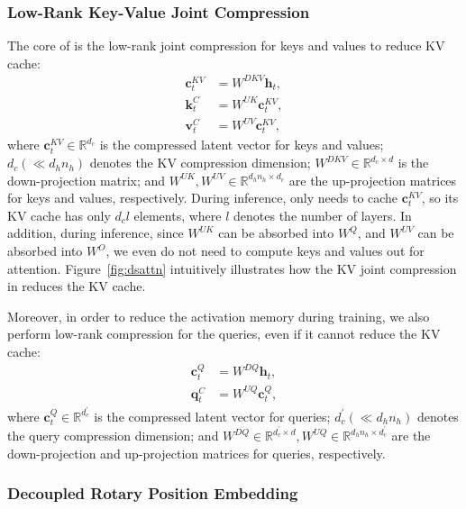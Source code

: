 \subsubsection{Low-Rank Key-Value Joint Compression}

The core of \dsattn{} is the low-rank joint compression for keys and values to reduce KV cache:
\begin{align}
    \mathbf{c}_{t}^{KV} &= W^{DKV} \mathbf{h}_{t}, \\
    \label{eq:c_to_k}
    \mathbf{k}_{t}^{C} &= W^{UK} \mathbf{c}_{t}^{KV}, \\
    \mathbf{v}_{t}^{C} &= W^{UV} \mathbf{c}_{t}^{KV},
\end{align}
where $\mathbf{c}_{t}^{KV} \in \mathbb{R}^{d_c}$ is the compressed latent vector for keys and values; 
$d_c (\ll d_h n_h)$ denotes the KV compression dimension;
$W^{DKV} \in \mathbb{R}^{d_c \times d}$ is the down-projection matrix;
and $W^{UK},W^{UV} \in \mathbb{R}^{d_h n_h \times d_c}$ are the up-projection matrices for keys and values, respectively. 
During inference, \dsattn{} only needs to cache $\mathbf{c}_{t}^{KV}$, so its KV cache has only $d_{c}l$ elements, where $l$ denotes the number of layers. 
In addition, during inference, since $W^{UK}$ can be absorbed into $W^{Q}$, and $W^{UV}$ can be absorbed into $W^{O}$, we even do not need to compute keys and values out for attention. 
Figure~\ref{fig:dsattn} intuitively illustrates how the KV joint compression in \dsattn{} reduces the KV cache. 

Moreover, in order to reduce the activation memory during training, we also perform low-rank compression for the queries, even if it cannot reduce the KV cache:
\begin{align}
    \mathbf{c}_{t}^{Q} &= W^{DQ} \mathbf{h}_{t}, \\
    \mathbf{q}_{t}^{C} &= W^{UQ} \mathbf{c}_{t}^{Q},
\end{align}
where $\mathbf{c}_{t}^{Q} \in \mathbb{R}^{d_c^{\prime}}$ is the compressed latent vector for queries; 
$d_c^{\prime} (\ll d_h n_h)$ denotes the query compression dimension; 
and $W^{DQ} \in \mathbb{R}^{d_c^{\prime} \times d}, W^{UQ} \in \mathbb{R}^{d_h n_h \times d_c^{\prime}}$ are the down-projection and up-projection matrices for queries, respectively. 

\subsubsection{Decoupled Rotary Position Embedding}

